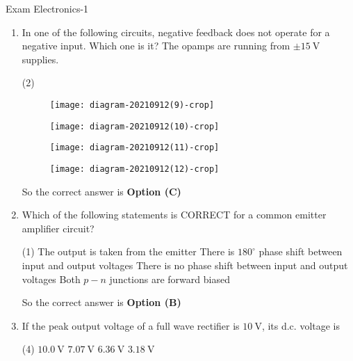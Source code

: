\begin{abox}
	Exam Electronics-1
	\end{abox}
\begin{enumerate}
	\item In one of the following circuits, negative feedback does not operate for a negative input. Which one is it? The opamps are running from $\pm 15 \mathrm{~V}$ supplies.
{	}
\begin{tasks}(2)
\task[\textbf{A.}] \begin{figure}[H]
	\centering
	\texttt{[image: diagram-20210912(9)-crop]}
\end{figure}
\task[\textbf{B.}] \begin{figure}[H]
	\centering
	\texttt{[image: diagram-20210912(10)-crop]}
\end{figure}
\task[\textbf{C.}] \begin{figure}[H]
	\centering
	\texttt{[image: diagram-20210912(11)-crop]}
\end{figure}
\task[\textbf{D.}] \begin{figure}[H]
	\centering
	\texttt{[image: diagram-20210912(12)-crop]}
\end{figure}
\end{tasks}
\begin{answer}
So the correct answer is \textbf{Option (C)}
\end{answer}
	\item Which of the following statements is CORRECT for a common emitter amplifier circuit?
	{}
\begin{tasks}(1)
\task[\textbf{A.}] The output is taken from the emitter
\task[\textbf{B.}] There is $180^{\circ}$ phase shift between input and output voltages
\task[\textbf{C.}] There is no phase shift between input and output voltages
\task[\textbf{D.}] Both $p-n$ junctions are forward biased
\end{tasks}
\begin{answer}
So the correct answer is \textbf{Option (B)}
\end{answer}
	\item If the peak output voltage of a full wave rectifier is $10 \mathrm{~V}$, its d.c. voltage is
{	}
\begin{tasks}(4)
\task[\textbf{A.}] $10.0 \mathrm{~V}$
\task[\textbf{B.}] $7.07 \mathrm{~V}$
\task[\textbf{C.}] $6.36 \mathrm{~V}$
\task[\textbf{D.}] $3.18 \mathrm{~V}$
\end{tasks}

\end{enumerate}
